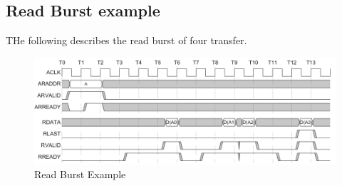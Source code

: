\documentclass{article}
\begin{document}
\subsection{Read Burst example}
\quad THe following describes the read burst of four transfer.
\begin{figure}[H]
    \centering
    \includegraphics[width=1\textwidth]{./Resources/readBurstExample.png}    
    \caption{Read Burst Example}
\end{figure}
\end{document}
